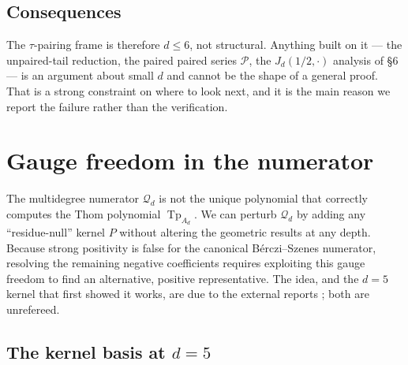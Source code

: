 \documentclass[11pt,a4paper]{article}
\DeclareMathOperator{\Tp}{Tp}
\newcommand{\Qd}{\mathcal{Q}}
\theoremstyle{plain}
\theoremstyle{definition}
\theoremstyle{remark}
\begin{document}
\subsection{Consequences}

The $\tau$-pairing frame is therefore $d \le 6$, not structural.  Anything built on it --- the
unpaired-tail reduction, the paired paired series $\mathcal{P}$, the $J_d(1/2,\cdot)$
analysis of \S6 --- is an argument about small $d$ and cannot be the shape of a general proof.
That is a strong constraint on where to look next, and it is the main reason we report the failure
rather than the verification.



\section{Gauge freedom in the numerator}
\label{sec:gauge}

The multidegree numerator $\Qd_d$ is not the unique polynomial that correctly computes the Thom polynomial $\Tp_{A_d}$. We can perturb $\Qd_d$ by adding any ``residue-null'' kernel $P$ without altering the geometric results at any depth. Because strong positivity is false for the canonical B\'erczi--Szenes numerator, resolving the remaining negative coefficients requires exploiting this gauge freedom to find an alternative, positive representative. The idea, and the $d=5$ kernel that first showed it works, are due to the external reports \cite{FS,A6}; both are unrefereed.

\subsection{The kernel basis at \texorpdfstring{$d = 5$}{d = 5}}
\end{document}
